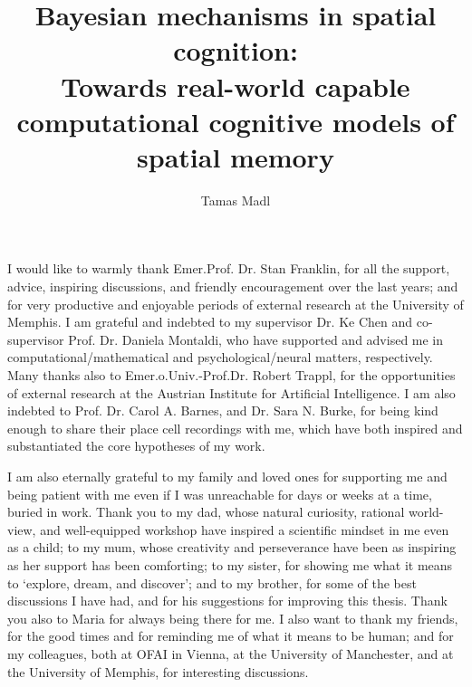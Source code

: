 \documentclass[12pt,PhD,twoside]{muthesis}
\begin{document}

\title{Bayesian mechanisms in spatial cognition:\\
Towards real-world capable computational cognitive models of spatial memory}
\author{Tamas Madl}

\beforeabstract





\afterabstract


I would like to warmly thank Emer.Prof. Dr. Stan Franklin, for all the support, advice, inspiring discussions, and friendly encouragement over the last years; and for very productive and enjoyable periods of external research at the University of Memphis. I am grateful and indebted to my supervisor Dr. Ke Chen and co-supervisor Prof. Dr. Daniela Montaldi, who have supported and advised me in computational/mathematical and psychological/neural matters, respectively. Many thanks also to Emer.o.Univ.-Prof.Dr. Robert Trappl, for the opportunities of external research at the Austrian Institute for Artificial Intelligence. I am also indebted to Prof. Dr. Carol A. Barnes, and Dr. Sara N. Burke, for being kind enough to share their place cell recordings with me, which have both inspired and substantiated the core hypotheses of my work. 

I am also eternally grateful to my family and loved ones for supporting me and being patient with me even if I was unreachable for days or weeks at a time, buried in work. Thank you to my dad, whose natural curiosity, rational world-view, and well-equipped workshop have inspired a scientific mindset in me even as a child; to my mum, whose creativity and perseverance have been as inspiring as her support has been comforting; to my sister, for showing me what it means to `explore, dream, and discover'; and to my brother, for some of the best discussions I have had, and for his suggestions for improving this thesis. Thank you also to Maria for always being there for me. I also want to thank my friends, for the good times and for reminding me of what it means to be human; and for my colleagues, both at OFAI in Vienna, at the University of Manchester, and at the University of Memphis, for interesting discussions.
\end{document}
